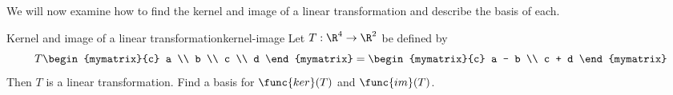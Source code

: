 We will now examine how to find the kernel and image of a linear transformation and describe the basis of each.

\begin{example}{Kernel and image of a linear transformation}{kernel-image}
Let $T: \R^4 \to \R^2$ be defined by
\[
T \begin{mymatrix}{c}
a \\
b \\
c \\
d
\end{mymatrix} =
\begin{mymatrix}{c}
a - b \\
c + d
\end{mymatrix}
\]
Then $T$ is a linear transformation. Find a basis for $\func{ker}(T)$ and $\func{im}(T)$.
\end{example}

